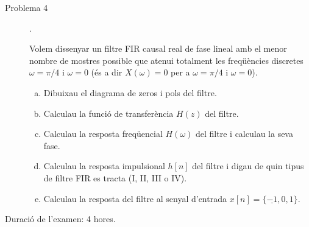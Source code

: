 \documentclass{article}[12pt]
\begin{document}
\begin{description}
\vskip 0.5cm


\item[Problema 4].

Volem dissenyar un filtre FIR causal real de fase lineal amb el menor nombre de mostres possible que atenui totalment les freqüències discretes $\omega=\pi/4$ i $\omega=0$ (és a dir $X(\omega)=0$ per a $\omega=\pi/4$ i $\omega=0$).

\begin{enumerate}[a)]
\item Dibuixau el diagrama de zeros i pols del filtre.
\item Calculau la funció de transferència $H(z)$ del filtre.
\item Calculau la resposta freqüencial $H(\omega)$ del filtre i calculau la seva fase.
\item Calculau la resposta impulsional $h[n]$ del filtre i digau de quin tipus de filtre FIR es tracta (I, II, III o IV).
\item Calculau la resposta del filtre al senyal d'entrada $x[n]=\{\underline{-1}, 0, 1\}$.
\end{enumerate}


\end{description}

\vskip 2cm

\noindent
Duració de l'examen: 4 hores.
\end{document}
